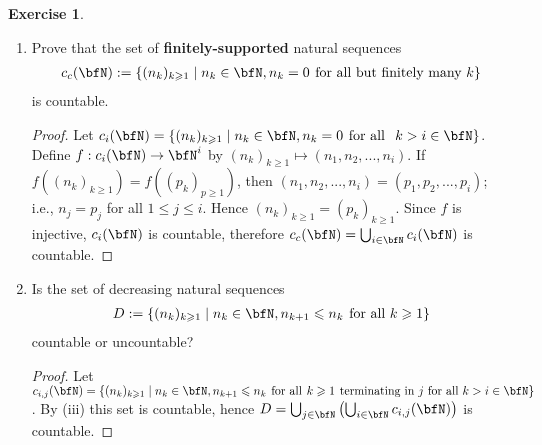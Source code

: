 \documentclass[10pt,twoside,openany]{memoir}
\theoremstyle{plain}
\theoremstyle{definition}
\newtheorem{exercise}{Exercise}
\theoremstyle{remark}
\numberwithin{equation}{section}
\renewcommand{\geq}{\geqslant}
\renewcommand{\leq}{\leqslant}
\begin{document}
\begin{exercise}
\begin{enumerate}[label = (\roman*)]
\begin{proof}
                        Note that $2^\bfN = \{f \mid f:\bfN \rightarrow \{0,1\}\} \subseteq \bfN^\infty$. Since $2^\bfN$ is uncountable, $\bfN^\infty$ must be uncountable.
                    \end{proof}
                \item Prove that the set of \textbf{finitely-supported} natural sequences
                    \begin{equation*}
                    \begin{split}
                        c_c(\bfN) := \{(n_k)_{k\geq 1} \mid n_k \in \bfN, n_k = 0 \hspace{4pt}\text{for all but finitely many $k$}\}
                    \end{split}
                    \end{equation*}
                is countable.
                    \begin{proof}
                        Let $c_i(\bfN) = \{(n_k)_{k\geq 1} \mid n_k \in \bfN , n_k = 0 \hspace{4pt}\text{for all }\hspace{4pt}k > i \in \bfN\}$. Define $f:c_i(\bfN) \rightarrow \bfN^i$ by $(n_k)_{k\geq 1} \mapsto (n_1,n_2,...,n_i)$. If $f((n_k)_{k\geq 1}) = f((p_k)_{p \geq 1})$, then $(n_1,n_2,...,n_i) = (p_1,p_2,...,p_i)$; i.e., $n_j = p_j$ for all $1 \leq j \leq i$. Hence $(n_k)_{k\geq1} = (p_k)_{k\geq1}$. Since $f$ is injective, $c_i(\bfN)$ is countable, therefore $c_c(\bfN) = \bigcup_{i \in \bfN} c_i(\bfN)$ is countable.
                    \end{proof}
                \item Is the set of decreasing natural sequences
                    \begin{equation*}
                    \begin{split}
                        D := \{(n_k)_{k \geq 1} \mid n_k \in \bfN, n_{k+1} \leq n_k \hspace{4pt}\text{for all $k \geq 1$}    \}
                    \end{split}
                    \end{equation*}
                countable or uncountable?
                \begin{proof}
                    Let $c_{i,j}(\bfN) = \{(n_k)_{k\geq1} \mid n_k \in \bfN, n_{k+1} \leq n_k \hspace{4pt} \text{for all}\hspace{4pt}k \geq 1 \hspace{4pt}\text{terminating in $j$ for all $k >i \in \bfN$}\}$. By (iii) this set is countable, hence $D = \bigcup_{j \in \bfN} \left( \bigcup_{i \in \bfN} c_{i,j}(\bfN)\right)$ is countable.
                \end{proof}
            \end{enumerate} 
    \end{exercise}
\end{document}
